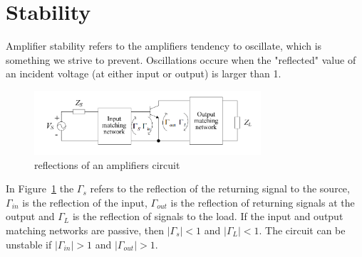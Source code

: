 \section{Stability}
Amplifier stability refers to the amplifiers tendency to oscillate, which is something we strive to prevent. Oscillations occure when the "reflected" value of an incident voltage (at either input or output) is larger than 1.
\begin{figure}[H]
	  \centering
	  \includegraphics[width=0.75\textwidth]{img/Reflection_example}
	  \caption{reflections of an amplifiers circuit}
	  \label{fig:fig_reflection_ex}
\end{figure}
In Figure~\ref{fig:fig_reflection_ex} the $\Gamma_s$ refers to the reflection of the returning signal to the source, $\Gamma_{in}$ is the reflection of the input, $\Gamma_{out}$ is the reflection of returning signals at the output and $\Gamma_L$ is the reflection of signals to the load. If the input and output matching networks are passive, then $|\Gamma_s|<1$ and $|\Gamma_L|<1$. The circuit can be unstable if $|\Gamma_{in}|>1$ and $|\Gamma_{out}|>1$. 

